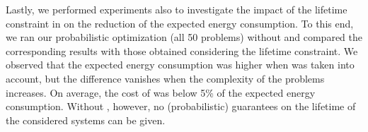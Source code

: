Lastly, we performed experiments also to investigate the impact of the lifetime constraint in  on the reduction of the expected energy consumption.
To this end, we ran our probabilistic optimization (all 50 problems) without  and compared the corresponding results with those obtained considering the lifetime constraint.
We observed that the expected energy consumption was higher when  was taken into account, but the difference vanishes when the complexity of the problems increases.
On average, the cost of  was below 5\% of the expected energy consumption.
Without , however, no (probabilistic) guarantees on the lifetime of the considered systems can be given.
